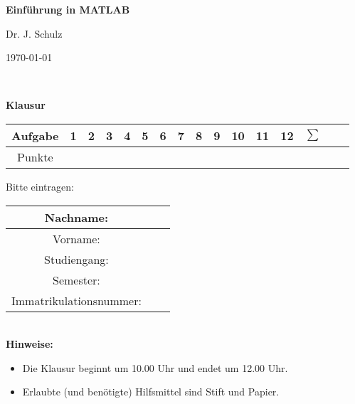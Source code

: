 \begin{center}
\textbf{\LARGE Einf\"uhrung in MATLAB }\\
\end{center}
\begin{minipage}{6cm}
Dr. J. Schulz
\end{minipage}\hfill
\begin{minipage}{4cm}
\today
\end{minipage}\\[1cm]

\begin{center}
\Huge \textbf{Klausur}
\end{center}
\bigskip\bigskip\bigskip
\Large
\begin{center}
\begin{tabular}{|Sl||p{0.5cm}|p{0.5cm}|p{0.5cm}|p{0.5cm}|p{0.5cm}|p{0.5cm}|p{0.5cm}|p{0.5cm}|p{0.5cm}|p{0.5cm}|p{0.5cm}|p{0.5cm}|p{0.5cm}||p{1cm}|}
\hline
Aufgabe & 1 & 2 & 3 & 4 & 5 & 6 & 7 & 8 & 9 & 10   & 11 & 12 & $\sum$ \\
\hline
Punkte &    &   &   &   &   &   &   &   &   &    &  & &     \\
\hline
\end{tabular}
\end{center}

\bigskip\bigskip\bigskip
Bitte eintragen:\\
\begin{center}
\begin{tabular}{|Sl|p{8cm}|}
\hline
Nachname: & \\
\hline
Vorname: & \\
\hline
Studiengang: & \\
\hline 
Semester: & \\
\hline 
Immatrikulationsnummer: & \\
\hline
\end{tabular}\\[1cm]
\textbf{Hinweise:}
\begin{itemize}
\item Die Klausur beginnt um 10.00 Uhr und endet um 12.00 Uhr.
\item Erlaubte (und ben\"otigte) Hilfsmittel sind Stift und Papier. 
\end{itemize}
\end{center}

\newpage
\normalsize
